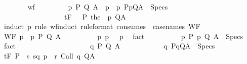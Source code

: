 \begin{isabellebody}
\ \ \ \ \ \ \isamarkupfalse%
\ wf\isanewline
\ \ \ \ \ \ \isamarkupfalse%
\ {\isachardoublequoteopen}{\isasymAnd}{\isasymtau}\ p\ P\ Q\ A{\isachardot}\ \ {\isasymlbrakk}{\isasymtau}p\ {\isacharequal}\ {\isacharparenleft}{\isasymtau}{\isacharcomma}p{\isacharparenright}{\isacharsemicolon}\ {\isacharparenleft}P{\isacharcomma}p{\isacharcomma}Q{\isacharcomma}A{\isacharparenright}\ {\isasymin}\ Specs{\isasymrbrakk}\ {\isasymLongrightarrow}\ \isanewline
\ \ \ \ \ \ \ \ \ \ \ \ \ \ \ \ \ \ {\isasymGamma}{\isasymTurnstile}\isactrlsub t\isactrlbsub {\isacharslash}F\isactrlesub \ {\isacharparenleft}{\isacharbraceleft}{\isasymtau}{\isacharbraceright}\ {\isasyminter}\ P{\isacharparenright}\ {\isacharparenleft}the\ {\isacharparenleft}{\isasymGamma}\ {\isacharparenleft}p{\isacharparenright}{\isacharparenright}{\isacharparenright}\ Q{\isacharcomma}A{\isachardoublequoteclose}\ \ \ \ \isanewline
\ \ \ \ \ \ \isamarkupfalse%
\ {\isacharparenleft}induct\ {\isasymtau}p\ rule{\isacharcolon}\ wf{\isacharunderscore}induct\ {\isacharbrackleft}rule{\isacharunderscore}format{\isacharcomma}\ consumes\ {}{\isacharcomma}\ case{\isacharunderscore}names\ WF{\isacharbrackright}{\isacharparenright}\isanewline
\ \ \ \ \ \ \ \ \isamarkupfalse%
\ {\isacharparenleft}WF\ {\isasymtau}p\ {\isasymtau}\ p\ P\ Q\ A{\isacharparenright}\isanewline
\ \ \ \ \ \ \ \ \isamarkupfalse%
\ {\isasymtau}p{\isacharcolon}\ {\isachardoublequoteopen}{\isasymtau}p\ {\isacharequal}\ {\isacharparenleft}{\isasymtau}{\isacharcomma}\ p{\isacharparenright}{\isachardoublequoteclose}\ \isamarkupfalse%
\ fact\isanewline
\ \ \ \ \ \ \ \ \isamarkupfalse%
\ p{\isacharcolon}\ {\isachardoublequoteopen}{\isacharparenleft}P{\isacharcomma}\ p{\isacharcomma}\ Q{\isacharcomma}\ A{\isacharparenright}\ {\isasymin}\ Specs{\isachardoublequoteclose}\ \isamarkupfalse%
\ fact\isanewline
\ \ \ \ \ \ \ \ \isacommand{{\isacharbraceleft}}\isamarkupfalse%
\isanewline
\ \ \ \ \ \ \ \ \ \ \isamarkupfalse%
\ q\ P{\isacharprime}\ Q{\isacharprime}\ A{\isacharprime}\isanewline
\ \ \ \ \ \ \ \ \ \ \isamarkupfalse%
\ q{\isacharcolon}\ {\isachardoublequoteopen}{\isacharparenleft}P{\isacharprime}{\isacharcomma}q{\isacharcomma}Q{\isacharprime}{\isacharcomma}A{\isacharprime}{\isacharparenright}\ {\isasymin}\ Specs{\isachardoublequoteclose}\isanewline
\ \ \ \ \ \ \ \ \ \ \isamarkupfalse%
\ {\isachardoublequoteopen}{\isasymGamma}{\isasymTurnstile}\isactrlsub t\isactrlbsub {\isacharslash}F\isactrlesub \ {\isacharparenleft}P{\isacharprime}\ {\isasyminter}\ {\isacharbraceleft}s{\isachardot}\ {\isacharparenleft}{\isacharparenleft}s{\isacharcomma}q{\isacharparenright}{\isacharcomma}\ {\isasymtau}{\isacharcomma}p{\isacharparenright}\ {\isasymin}\ r{\isacharbraceright}{\isacharparenright}\ {\isacharparenleft}Call\ q{\isacharparenright}\ Q{\isacharprime}{\isacharcomma}A{\isacharprime}{\isachardoublequoteclose}\isanewline

\end{isabellebody}
